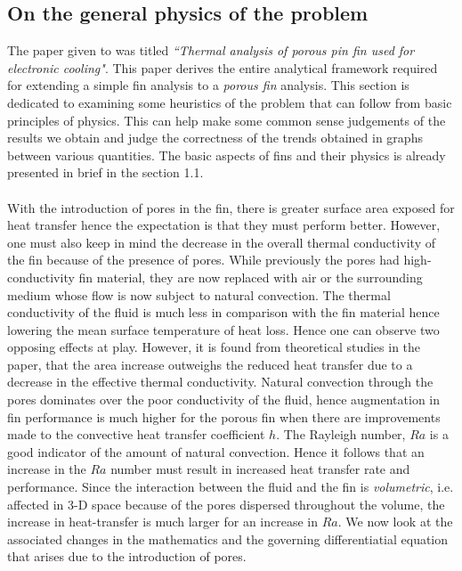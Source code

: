 \documentclass[12pt]{article}
\begin{document}
\subsection{On the general physics of the problem}
The paper given to was titled \emph{``Thermal analysis of porous pin fin used for electronic cooling"}. This paper derives the entire analytical framework required for extending a simple fin analysis to a \emph{porous fin} analysis. This section is dedicated to examining some heuristics of the problem that can follow from basic principles of physics. This can help make some common sense judgements of the results we obtain and judge the correctness of the trends obtained in graphs between various quantities. The basic aspects of fins and their physics is already presented in brief in the section 1.1.\\ \\
With the introduction of pores in the fin, there is greater surface area exposed for heat transfer hence the expectation is that they must perform better. However, one must also keep in mind the decrease in the overall thermal conductivity of the fin because of the presence of pores. While previously the pores had high-conductivity fin material, they are now replaced with air or the surrounding medium whose flow is now subject to natural convection. The thermal conductivity of the fluid is much less in comparison with the fin material hence lowering the mean surface temperature of heat loss. Hence one can observe two opposing effects at play. However, it is found from theoretical studies in the paper, that the area increase outweighs the reduced heat transfer due to a decrease in the effective thermal conductivity. Natural convection through the pores dominates over the poor conductivity of the fluid, hence augmentation in fin performance is much higher for the porous fin when there are improvements made to the convective heat transfer coefficient $h$. The Rayleigh number, $Ra$ is a good indicator of the amount of natural convection. Hence it follows that an increase in the $Ra$ number must result in increased heat transfer rate and performance. Since the interaction between the fluid and the fin is \emph{volumetric}, i.e. affected in 3-D space because of the pores dispersed throughout the volume, the increase in heat-transfer is much larger for an increase in $Ra$.  We now look at the associated changes in the mathematics and the governing differentiatial equation that arises due to the introduction of pores.
\end{document}
